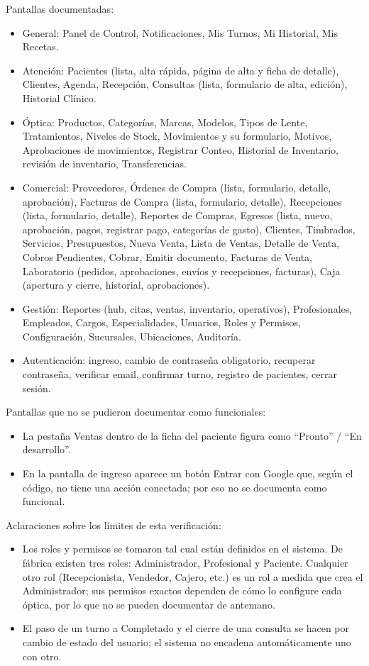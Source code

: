 Pantallas documentadas:
\begin{itemize}
  \item General: Panel de Control, Notificaciones, Mis Turnos, Mi Historial, Mis Recetas.
  \item Atención: Pacientes (lista, alta rápida, página de alta y ficha de detalle), Clientes, Agenda, Recepción, Consultas (lista, formulario de alta, edición), Historial Clínico.
  \item Óptica: Productos, Categorías, Marcas, Modelos, Tipos de Lente, Tratamientos, Niveles de Stock, Movimientos y su formulario, Motivos, Aprobaciones de movimientos, Registrar Conteo, Historial de Inventario, revisión de inventario, Transferencias.
  \item Comercial: Proveedores, Órdenes de Compra (lista, formulario, detalle, aprobación), Facturas de Compra (lista, formulario, detalle), Recepciones (lista, formulario, detalle), Reportes de Compras, Egresos (lista, nuevo, aprobación, pagos, registrar pago, categorías de gasto), Clientes, Timbrados, Servicios, Presupuestos, Nueva Venta, Lista de Ventas, Detalle de Venta, Cobros Pendientes, Cobrar, Emitir documento, Facturas de Venta, Laboratorio (pedidos, aprobaciones, envíos y recepciones, facturas), Caja (apertura y cierre, historial, aprobaciones).
  \item Gestión: Reportes (hub, citas, ventas, inventario, operativos), Profesionales, Empleados, Cargos, Especialidades, Usuarios, Roles y Permisos, Configuración, Sucursales, Ubicaciones, Auditoría.
  \item Autenticación: ingreso, cambio de contraseña obligatorio, recuperar contraseña, verificar email, confirmar turno, registro de pacientes, cerrar sesión.
\end{itemize}

Pantallas que no se pudieron documentar como funcionales:
\begin{itemize}
  \item La pestaña Ventas dentro de la ficha del paciente figura como ``Pronto'' / ``En desarrollo''.
  \item En la pantalla de ingreso aparece un botón Entrar con Google que, según el código, no tiene una acción conectada; por eso no se documenta como funcional.
\end{itemize}

Aclaraciones sobre los límites de esta verificación:
\begin{itemize}
  \item Los roles y permisos se tomaron tal cual están definidos en el sistema. De fábrica existen tres roles: Administrador, Profesional y Paciente. Cualquier otro rol (Recepcionista, Vendedor, Cajero, etc.) es un rol a medida que crea el Administrador; sus permisos exactos dependen de cómo lo configure cada óptica, por lo que no se pueden documentar de antemano.
  \item El paso de un turno a Completado y el cierre de una consulta se hacen por cambio de estado del usuario; el sistema no encadena automáticamente uno con otro.
\end{itemize}
